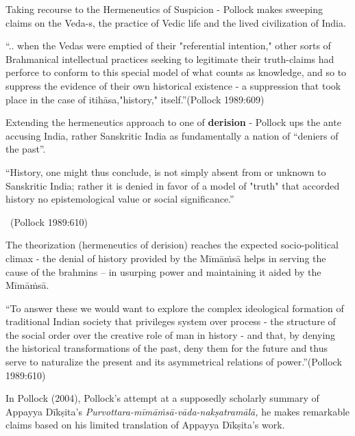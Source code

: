 Taking recourse to the Hermeneutics of Suspicion - Pollock makes sweeping claims on the Veda-s, the practice of Vedic life and the lived civilization of India.

\begin{myquote}
“.. when the Vedas were emptied of their "referential intention," other sorts of Brahmanical intellectual practices seeking to legitimate their truth-claims had perforce to conform to this special model of what counts as knowledge, and so to suppress the evidence of their own historical existence - a suppression that took place in the case of itihāsa,"history," itself.”\hfill (Pollock 1989:609)
\end{myquote}

Extending the hermeneutics approach to one of \textbf{derision }- Pollock ups the ante accusing India, rather Sanskritic India as fundamentally a nation of “deniers of the past”.

\begin{myquote}
“History, one might thus conclude, is not simply absent from or unknown to Sanskritic India; rather it is denied in favor of a model of "truth" that accorded history no epistemological value or social significance.”

~\hfill (Pollock 1989:610)
\end{myquote}

The theorization (hermeneutics of derision) reaches the expected socio-political climax - the denial of history provided by the Mīmāṁsā helps in serving the cause of the brahmins – in usurping power and maintaining it aided by the Mīmāṁsā.

\smallskip

\begin{myquote}
“To answer these we would want to explore the complex ideological formation of traditional Indian society that privileges system over process - the structure of the social order over the creative role of man in history - and that, by denying the historical transformations of the past, deny them for the future and thus serve to naturalize the present and its asymmetrical relations of power.”\hfill (Pollock 1989:610)
\end{myquote}

\smallskip

In Pollock (2004), Pollock’s attempt at a supposedly scholarly summary of Appayya Dīkṣita’s \textit{Purvottara-mīmāṁsā-vāda-nakṣatramālā,} he makes remarkable claims based on his limited translation of Appayya Dīkṣita’s work.

